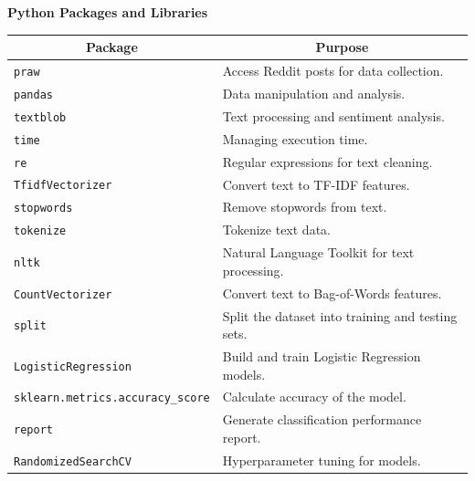 \noindent
\textbf{Python Packages and Libraries}
\begin{table}[h!]
\centering
\begin{tabular}{|p{9cm}|p{6cm}|}
  \hline
  \multicolumn{1}{|c|}{\textbf{Package}} & \multicolumn{1}{c|}{\textbf{Purpose}} \\
  
  \hline
  \texttt{praw} & Access Reddit posts for data collection. \\
  
  \hline
  \texttt{pandas} & Data manipulation and analysis. \\
  
  \hline
  \texttt{textblob} & Text processing and sentiment analysis. \\
  
  \hline
  \texttt{time} & Managing execution time. \\
  
  \hline
  \texttt{re} & Regular expressions for text cleaning. \\
  
  \hline
  \texttt{TfidfVectorizer} & Convert text to TF-IDF features. \\
  
  \hline
  \texttt{stopwords} & Remove stopwords from text. \\
  
  \hline
  \texttt{tokenize} & Tokenize text data. \\
  
  \hline
  \texttt{nltk} & Natural Language Toolkit for text processing. \\
  
  \hline
  \texttt{CountVectorizer} & Convert text to Bag-of-Words features. \\
  
  \hline
  \texttt{split} & Split the dataset into training and testing sets. \\
  
  \hline
  \texttt{LogisticRegression} & Build and train Logistic Regression models. \\
  
  \hline
  \texttt{sklearn.metrics.accuracy\_score} & Calculate accuracy of the model. \\
  
  \hline
  \texttt{report} & Generate classification performance report. \\
  
  \hline
  \texttt{RandomizedSearchCV} & Hyperparameter tuning for models. \\
  

\end{tabular}
\end{table}
